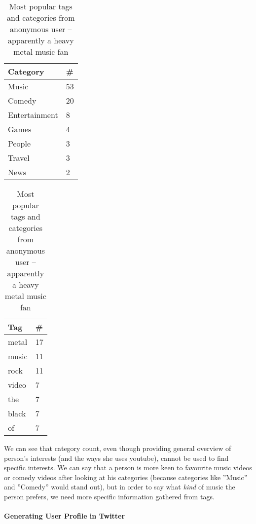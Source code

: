 \begin{table}[ht]
\begin{minipage}[b]{0.5\linewidth}\centering

\begin{tabular}{| l | l |}
Category & \# \\ \hline
Music & 53 \\
Comedy & 20 \\
Entertainment & 8 \\
Games & 4 \\
People & 3 \\
Travel & 3 \\
News & 2 \\
\end{tabular}

\end{minipage}
\hspace{0.5cm}
\begin{minipage}[b]{0.5\linewidth}
\centering

\begin{tabular}{| l | l |}
Tag & \# \\ \hline
metal & 17 \\
music & 11 \\
rock & 11 \\
video & 7 \\
the & 7 \\
black & 7 \\
of & 7 \\
\end{tabular}

\end{minipage}

\caption{Most popular tags and categories from anonymous user -- apparently a
heavy metal music fan}
\end{table}

We can see that category count, even though providing general overview of
person's interests (and the ways she uses youtube), cannot be used to find
specific interests. We can say that a person is more keen to
favourite music videos or comedy videos after looking at his categories
(because categories like ''Music'' and ''Comedy'' would stand out), but in
order to say what \textit{kind} of music the person prefers, we need more specific
information gathered from \eg tags.

\paragraph{Generating User Profile in Twitter}

